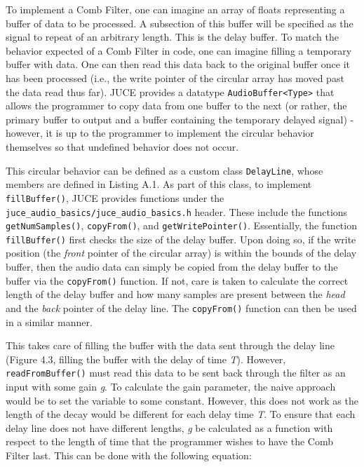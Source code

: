 To implement a Comb Filter, one can imagine an array of floats representing a buffer of data to be processed. A subsection of this buffer will be specified as the signal to repeat of an arbitrary length. This is the delay buffer. To match the behavior expected of a Comb Filter in code, one can imagine filling a temporary buffer with data. One can then read this data back to the original buffer once it has been processed (i.e., the write pointer of the circular array has moved past the data read thus far). JUCE provides a datatype \verb|AudioBuffer<Type>| that allows the programmer to copy data from one buffer to the next (or rather, the primary buffer to output and a buffer containing the temporary delayed signal) - however, it is up to the programmer to implement the circular behavior themselves so that undefined behavior does not occur.
\lstset{language =[ANSI]C++}
\lstset{linewidth=.95\textwidth,breaklines=true}
\lstset{commentstyle=\textit,stringstyle=\upshape,showspaces=false}
\lstset{frame = single}
\lstset{numbers=left,numberstyle=\tiny,basicstyle=\small}
\lstset{commentstyle=\normalfont\itshape,breakautoindent=true}
\lstset{abovecaptionskip=1.2\baselineskip,xleftmargin=30pt}
\lstset{framesep=6pt}
\begin{singlespace}

\end{singlespace} \hfill \break
\hspace*{0.6cm}This circular behavior can be defined as a custom class \verb|DelayLine|, whose members are defined in Listing A.1. As part of this class, to implement \verb|fillBuffer()|, JUCE provides functions under the \verb|juce_audio_basics/juce_audio_basics.h| header. These include the functions \verb|getNumSamples()|, \verb|copyFrom()|, and \verb|getWritePointer()|. Essentially, the function \verb|fillBuffer()| first checks the size of the delay buffer. Upon doing so, if the write position (the \textit{front} pointer of the circular array) is within the bounds of the delay buffer, then the audio data can simply be copied from the delay buffer to the buffer via the \verb|copyFrom()| function. If not, care is taken to calculate the correct length of the delay buffer and how many samples are present between the \textit{head} and the \textit{back} pointer of the delay line. The \verb|copyFrom()| function can then be used in a similar manner.

This takes care of filling the buffer with the data sent through the delay line (Figure 4.3, filling the buffer with the delay of time \textit{T}). However, \verb|readFromBuffer()| must read this data to be sent back through the filter as an input with some gain \textit{g}. To calculate the gain parameter, the naive approach would be to set the variable to some constant. However, this does not work as the length of the decay would be different for each delay time \textit{T}. To ensure that each delay line does not have different lengths, \textit{g} be calculated as a function with respect to the length of time that the programmer wishes to have the Comb Filter last. This can be done with the following equation:

